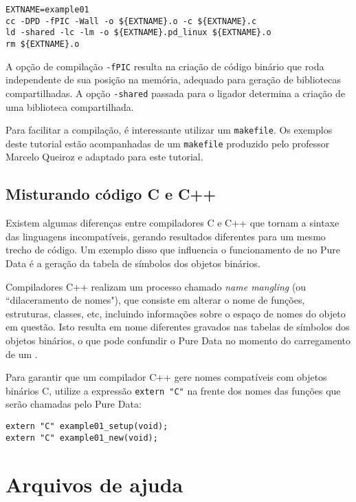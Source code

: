 \vspace{1em}
\begin{lstlisting}
EXTNAME=example01
cc -DPD -fPIC -Wall -o ${EXTNAME}.o -c ${EXTNAME}.c
ld -shared -lc -lm -o ${EXTNAME}.pd_linux ${EXTNAME}.o
rm ${EXTNAME}.o
\end{lstlisting}

A opção de compilação \texttt{-fPIC} resulta na criação de código binário que
roda independente de sua posição na memória, adequado para geração de
bibliotecas compartilhadas. A opção \texttt{-shared} passada para o ligador
determina a criação de uma biblioteca compartilhada.

Para facilitar a compilação, é interessante utilizar um \texttt{makefile}. Os
exemplos deste tutorial estão acompanhadas de um \texttt{makefile} produzido
pelo professor Marcelo Queiroz e adaptado para este tutorial.

\subsection{Misturando código C e C++}

Existem algumas diferenças entre compiladores C e C++ que tornam a sintaxe das
linguagens incompatíveis, gerando resultados diferentes para um mesmo trecho
de código. Um exemplo disso que influencia o funcionamento de \externals no
Pure Data é a geração da tabela de símbolos dos objetos binários.

Compiladores C++ realizam um processo chamado \emph{name mangling} (ou
``dilaceramento de nomes"), que consiste em alterar o nome de funções,
estruturas, classes, etc, incluindo informações sobre o espaço de nomes do
objeto em questão. Isto resulta em nome diferentes gravados nas tabelas de
símbolos dos objetos binários, o que pode confundir o Pure Data no momento do
carregamento de um \external.

Para garantir que um compilador C++ gere nomes compatíveis com objetos
binários C, utilize a expressão \texttt{extern "C"} na frente dos nomes das
funções que serão chamadas pelo Pure Data:

\begin{lstlisting}
extern "C" example01_setup(void);
extern "C" example01_new(void);
\end{lstlisting}

\section{Arquivos de ajuda}

